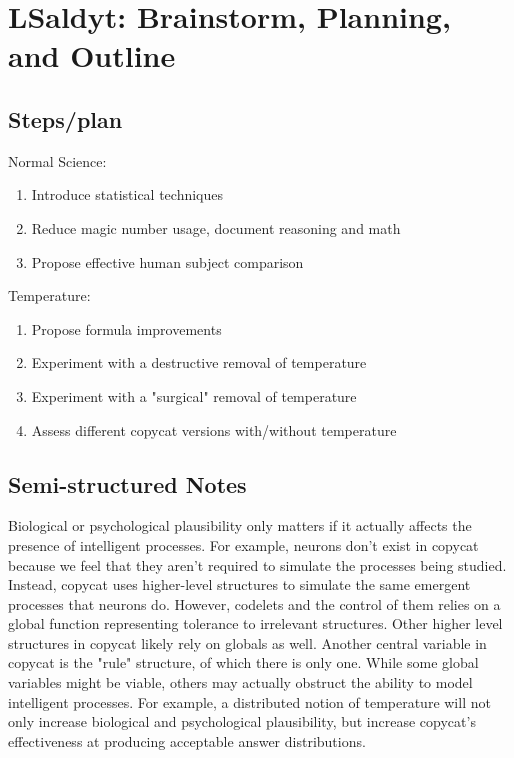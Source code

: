 \documentclass[a4paper]{article}
\begin{document}
\section{LSaldyt: Brainstorm, Planning, and Outline}

\subsection{Steps/plan}

Normal Science:
\begin{enumerate}
	\item Introduce statistical techniques
    \item Reduce magic number usage, document reasoning and math
    \item Propose effective human subject comparison
\end{enumerate}
Temperature:
\begin{enumerate}
	\item Propose formula improvements
    \item Experiment with a destructive removal of temperature
    \item Experiment with a "surgical" removal of temperature
    \item Assess different copycat versions with/without temperature
\end{enumerate}

\subsection{Semi-structured Notes}

Biological or psychological plausibility only matters if it actually affects the presence of intelligent processes. For example, neurons don't exist in copycat because we feel that they aren't required to simulate the processes being studied. Instead, copycat uses higher-level structures to simulate the same emergent processes that neurons do. However, codelets and the control of them relies on a global function representing tolerance to irrelevant structures. Other higher level structures in copycat likely rely on globals as well. Another central variable in copycat is the "rule" structure, of which there is only one. While some global variables might be viable, others may actually obstruct the ability to model intelligent processes. For example, a distributed notion of temperature will not only increase biological and psychological plausibility, but increase copycat's effectiveness at producing acceptable answer distributions.
\end{document}
